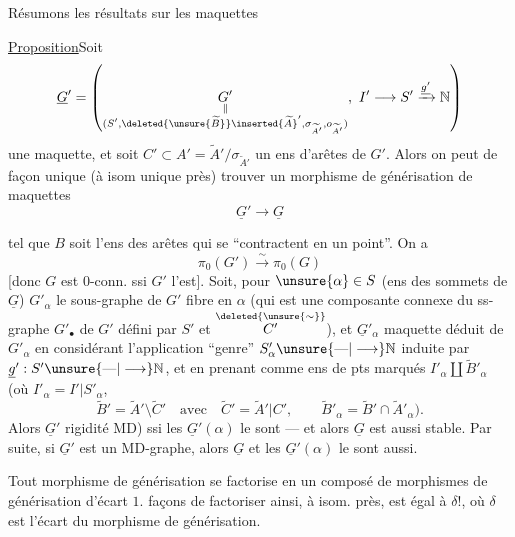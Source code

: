 Résumons les résultats sur les maquettes

\uline{Proposition}\quad Soit
\[
\underline G'=\left(\underset{\substack{\Vert\\(S',\deleted{\unsure{\widetilde B}}\inserted{\widetilde A}',\sigma_{\widetilde A'},o_{\widetilde A'})}}{G'},\ I'\longrightarrow S'\xrightarrow{\underline{g'}}\mathbb N\right)
\]
une maquette, et soit $C'\subset A'=\widetilde A'/\sigma_{\widetilde A'}$ un ens d'arêtes de $G'$. Alors on peut de façon unique  (à isom unique près) trouver un morphisme de générisation de maquettes
\[
\underline G'\longrightarrow\underline G
\]

tel que $B$ soit l'ens des arêtes  qui se ``contractent en un point''. On a
\[
\pi_0(G')\overset{\sim}{\longrightarrow}\pi_0(G)
\]
[donc $G$ est $0$-conn. ssi $G'$ l'est].  Soit, pour  $\unsure{\alpha}\in S$ (ens des sommets de $\underline{G}$) $G'_\alpha$ le sous-graphe de $G'$ fibre en $\alpha$ (qui est une composante connexe du ss-graphe $G'_\bullet$ de $G'$ défini par $S'$ et $\overset{\deleted{\unsure{\sim}}}{C'}$), et $\underline{G}'_\alpha$  maquette déduit de $G'_\alpha$ en considérant l'application ``genre'' $S'_\alpha\unsure{\mathbin{\text{---}}|\longrightarrow}\mathbb N$ induite par $\underline{g}':S'\unsure{\mathbin{\text{---}}|\longrightarrow}\mathbb N$, et en prenant comme ens de pts marqués $I'_\alpha\amalg\widetilde{B}'_\alpha$ (où $I'_\alpha=I'|S'_\alpha$,
\[
\widetilde{B}'=\widetilde{A}'\setminus\widetilde{C}'\quad\text{avec}\quad
\widetilde{C}'=\widetilde{A}'|C',\qquad
\widetilde{B}'_\alpha=\widetilde{B}'\cap\widetilde{A}'_\alpha).
\]
Alors $\underline{G}'$   rigidité MD) ssi les $\underline{G}'(\alpha)$ le sont --- et alors $\underline{G}$ est aussi stable. Par suite, si $\underline{G}'$ est un MD-graphe, alors $\underline{G}$ et les $\underline{G}'(\alpha)$ le sont aussi.

Tout morphisme de générisation se factorise en un composé de morphismes de générisation d'écart $1$.   façons de factoriser ainsi, à isom. près, est égal à $\delta!$, où $\delta$ est l'écart du morphisme de générisation.

